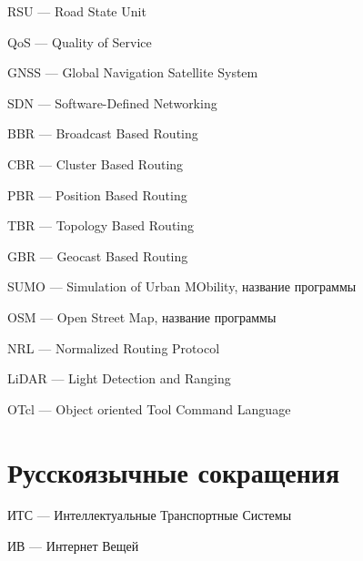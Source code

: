 RSU --- Road State Unit

QoS --- Quality of Service

GNSS --- Global Navigation Satellite System

SDN --- Software-Defined Networking

BBR --- Broadcast Based Routing

CBR --- Cluster Based Routing

PBR --- Position Based Routing

TBR --- Topology Based Routing

GBR --- Geocast Based Routing

SUMO --- Simulation of Urban MObility, название программы

OSM --- Open Street Map, название программы

NRL --- Normalized Routing Protocol

LiDAR --- Light Detection and Ranging

OTcl --- Object oriented Tool Command Language

\section*{Русскоязычные сокращения}

\mbox{}

ИТС --- Интеллектуальные Транспортные Системы

ИВ --- Интернет Вещей
